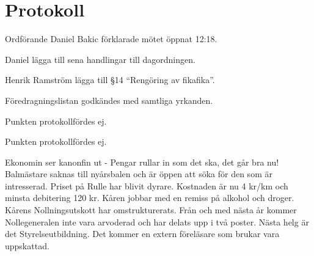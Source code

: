 \documentclass[10pt]{article}
\def\mo{Daniel Bakic}
\begin{document}
\section*{Protokoll}
\begin{paragrafer}
	Ordförande {\mo} förklarade mötet öppnat 12:18.

	{\valavmo}

	{\valavms}

	{\valavj}

	{\tosg}

	{\ingaadj}

	Daniel \ypa lägga till sena handlingar till dagordningen.

	Henrik Ramström \ypa lägga till \S14 ``Rengöring av fikafika''.

	Föredragningslistan godkändes med samtliga yrkanden.

	\ingaprot

	\begin{fyllnadsval} %
	\end{fyllnadsval}

	\begin{paragrafer}
		Punkten protokollfördes ej.

		Punkten protokollfördes ej.

		Ekonomin ser kanonfin ut - Pengar rullar in som det ska, det går bra nu!
		Balmästare saknas till nyårsbalen och är öppen att söka för den som är intresserad.
    Priset på Rulle har blivit  dyrare. Kostnaden är nu 4 kr/km och minsta debitering 120 kr.
    Kåren jobbar med en remiss på alkohol och droger. Kårens Nollningsutskott har omstrukturerats.
    Från och med nästa år kommer Nollegeneralen inte vara arvoderad och har delats upp i två poster.
    Nästa helg är det Styrelseutbildning. Det kommer en extern föreläsare som brukar vara uppskattad.


\end{paragrafer}
\end{paragrafer}
\end{document}
